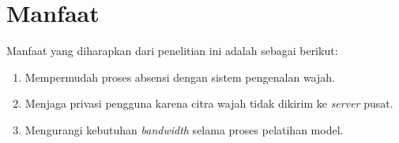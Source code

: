 \section{Manfaat}
\label{sec:manfaat}

Manfaat yang diharapkan dari penelitian ini adalah sebagai berikut:
\begin{enumerate}[itemsep=1pt]
    \item Mempermudah proses absensi dengan sistem pengenalan wajah.
    \item Menjaga privasi pengguna karena citra wajah tidak dikirim ke \textit{server} pusat.
    \item Mengurangi kebutuhan \textit{bandwidth} selama proses pelatihan model.
\end{enumerate}
